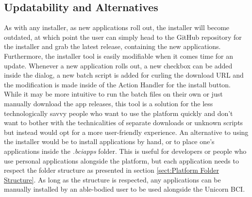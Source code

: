 \subsection{Updatability and Alternatives}
As with any installer, as new applications roll out, the installer will become outdated, at which point the user can simply head to the GitHub repository for the installer and grab the latest release, containing the new applications. Furthermore, the installer tool is easily modifiable when it comes time for an update. Whenever a new application rolls out, a new checkbox can be added inside the dialog, a new batch script is added for curling the download URL and the modification is made inside of the Action Handler for the install button. While it may be more intuitive to run the batch files on their own or just manually download the app releases, this tool is a solution for the less technologically savvy people who want to use the platform quickly and don't want to bother with the technicalities of separate downloads or unknown scripts but instead would opt for a more user-friendly experience.
\vspace{\baselineskip}\newline
An alternative to using the installer would be to install applications by hand, or to place one's applications inside the \textit{.bciapps} folder. This is useful for developers or people who use personal applications alongside the platform, but each application needs to respect the folder structure as presented in section \ref{sect:Platform Folder Structure}. As long as the structure is respected, any applications can be manually installed by an able-bodied user to be used alongside the Unicorn BCI.


